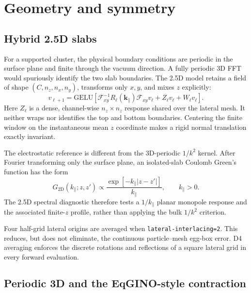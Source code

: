 \documentclass[11pt]{article}
\newcommand{\code}[1]{\texttt{#1}}
\begin{document}
\section{Geometry and symmetry}

\subsection{Hybrid 2.5D slabs}

For a supported cluster, the physical boundary conditions are periodic in the
surface plane and finite through the vacuum direction. A fully periodic 3D
FFT would spuriously identify the two slab boundaries. The 2.5D model retains
a field of shape \((C,n_z,n_x,n_y)\), transforms only \(x,y\), and mixes
\(z\) explicitly:
\begin{equation}
 v_{\ell+1}=\mathrm{GELU}\left[
 \mathcal F_{xy}^{-1}R_\ell(\mathbf k_\parallel)\mathcal F_{xy}v_\ell+
 Z_\ell v_\ell+W_\ell v_\ell\right].
\end{equation}
Here \(Z_\ell\) is a dense, channel-wise \(n_z\times n_z\) response shared
over the lateral mesh. It neither wraps nor identifies the top and bottom
boundaries. Centering the finite window on the instantaneous mean \(z\)
coordinate makes a rigid normal translation exactly invariant.

The electrostatic reference is different from the 3D-periodic \(1/k^2\)
kernel. After Fourier transforming only the surface plane, an isolated-slab
Coulomb Green's function has the form
\begin{equation}
 G_{2\mathrm D}(k_\parallel;z,z')\propto
 \frac{\exp[-k_\parallel|z-z'|]}{k_\parallel},\qquad k_\parallel>0.
\end{equation}
The 2.5D spectral diagnostic therefore tests a \(1/k_\parallel\) planar
monopole response and the associated finite-\(z\) profile, rather than applying
the bulk \(1/k^2\) criterion.


Four half-grid lateral origins are averaged when
\code{lateral-interlacing=2}. This reduces, but does not eliminate, the
continuous particle--mesh egg-box error. D4 averaging enforces the discrete
rotations and reflections of a square lateral grid in every forward
evaluation.

\subsection{Periodic 3D and the EqGINO-style contraction}
\end{document}
